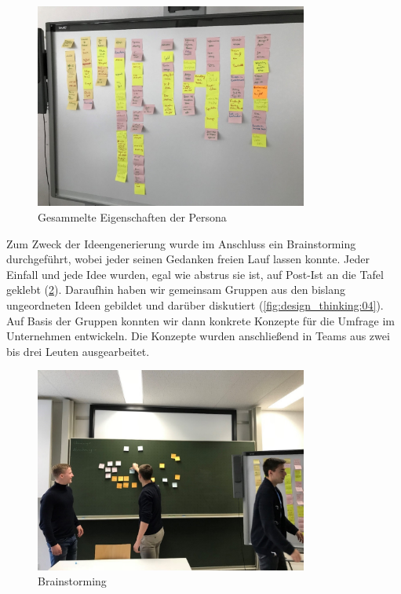 \begin{figure}[h]
\centering
\includegraphics[width=0.8\textwidth]{images/design_thinking/02}
\caption[Gesammelte Eigenschaften der Persona]{Gesammelte Eigenschaften der Persona}
\label{fig:design_thinking:02}
\end{figure}
 
Zum Zweck der Ideengenerierung wurde im Anschluss ein Brainstorming durchgeführt, wobei jeder seinen Gedanken freien Lauf lassen konnte. Jeder Einfall und jede Idee wurden, egal wie abstrus sie ist, auf Post-Ist an die Tafel geklebt (\ref{fig:design_thinking:03}). Daraufhin haben wir gemeinsam Gruppen aus den bislang ungeordneten Ideen gebildet und darüber diskutiert (\ref{fig:design_thinking:04}). Auf Basis der Gruppen konnten wir dann konkrete Konzepte für die Umfrage im Unternehmen entwickeln. Die Konzepte wurden anschließend in Teams aus zwei bis drei Leuten ausgearbeitet.
 
\begin{figure}[h]
\centering
\includegraphics[width=0.8\textwidth]{images/design_thinking/03}
\caption[Brainstorming]{Brainstorming}
\label{fig:design_thinking:03}
\end{figure} 

